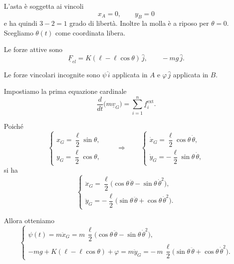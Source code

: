 \begin{example}{}
\begin{center}
\end{center}


L'asta è soggetta ai vincoli
\[
x_A=0,\qquad y_B=0
\]
e ha quindi \(3-2=1\) grado di libertà. Inoltre la molla è a riposo per
\(\theta=0\). Scegliamo \(\theta(t)\) come coordinata libera.

Le forze attive sono
\[
\underline{F}_{el}=K(\ell-\ell\cos\theta)\,\hat{j},
\qquad
-mg\,\hat{j}.
\]

Le forze vincolari incognite sono \(\psi\,\hat{i}\) applicata in \(A\) e
\(\varphi\,\hat{j}\) applicata in \(B\).

Impostiamo la prima equazione cardinale
\[
\frac{d}{dt}\bigl(m\underline{v}_G\bigr)=\sum_{i=1}^{n}\underline{f}_i^{\mathrm{ext}}.
\]

Poiché
\[
\begin{cases}
x_G=\dfrac{\ell}{2}\sin\theta,\\[4pt]
y_G=\dfrac{\ell}{2}\cos\theta,
\end{cases}
\qquad \Rightarrow \qquad
\begin{cases}
\dot{x}_G=\dfrac{\ell}{2}\cos\theta\,\dot{\theta},\\[4pt]
\dot{y}_G=-\dfrac{\ell}{2}\sin\theta\,\dot{\theta},
\end{cases}
\]
si ha
\[
\begin{cases}
\ddot{x}_G=\dfrac{\ell}{2}\bigl(\cos\theta\,\ddot{\theta}-\sin\theta\,\dot{\theta}^{2}\bigr),\\[6pt]
\ddot{y}_G=-\dfrac{\ell}{2}\bigl(\sin\theta\,\ddot{\theta}+\cos\theta\,\dot{\theta}^{2}\bigr).
\end{cases}
\]

Allora otteniamo
\[
\begin{cases}
\psi(t)=m\ddot{x}_G
=
m\,\dfrac{\ell}{2}\bigl(\cos\theta\,\ddot{\theta}-\sin\theta\,\dot{\theta}^{2}\bigr),\\[10pt]
-mg+K(\ell-\ell\cos\theta)+\varphi
=
m\ddot{y}_G
=
-\,m\,\dfrac{\ell}{2}\bigl(\sin\theta\,\ddot{\theta}+\cos\theta\,\dot{\theta}^{2}\bigr).
\end{cases}
\]


\end{example}
